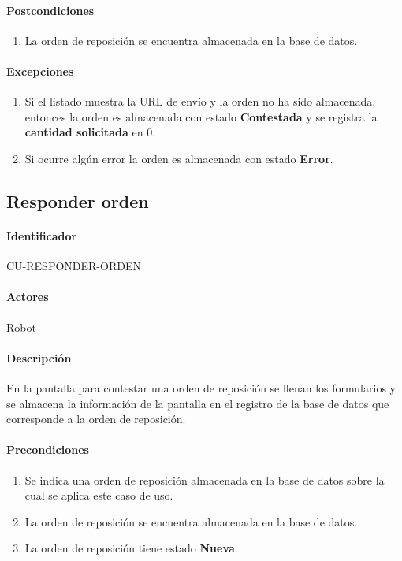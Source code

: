 \paragraph*{Postcondiciones}
\begin{enumerate}
  \item La orden de reposición se encuentra almacenada en la base de datos.
\end{enumerate}
\paragraph*{Excepciones}
\begin{enumerate}
  \item Si el listado muestra la URL de envío y la orden no ha sido almacenada, entonces la orden es almacenada con estado \textbf{Contestada} y se registra la \textbf{cantidad solicitada} en 0.
  \item Si ocurre algún error la orden es almacenada con estado \textbf{Error}.
\end{enumerate}


\subsection{Responder orden}
\paragraph*{Identificador}
CU-RESPONDER-ORDEN
\paragraph*{Actores}
Robot
\paragraph*{Descripción}
En la pantalla para contestar una orden de reposición se llenan los formularios y se almacena la información de la pantalla en el registro de la base de datos que corresponde a la orden de reposición.
\paragraph*{Precondiciones}
\begin{enumerate}
  \item Se indica una orden de reposición almacenada en la base de datos sobre la cual se aplica este caso de uso.
  \item La orden de reposición se encuentra almacenada en la base de datos.
  \item La orden de reposición tiene estado \textbf{Nueva}.
\end{enumerate}
